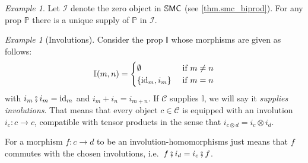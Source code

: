 \documentclass[11pt, oneside, article]{memoir}
\theoremstyle{plain}
\theoremstyle{definition}
\theoremstyle{remark}
\newtheorem{example}[theorem]{Example}
\newcommand{\cat}[1]{\mathcal{#1}}%
\newcommand{\ccat}[1]{\mathbb{#1}}%
\newcommand{\Cat}[1]{{\mathsf{#1}}}%
\newcommand{\CCat}[1]{\mathbb{\StrLeft{#1}{1}}\Cat{\StrGobbleLeft{#1}{1}}}%
\DeclareMathOperator{\id}{id}
\newcommand{\tn}[1]{\textnormal{#1}}
\newcommand{\ssmc}{\CCat{SMC}}
\newcommand{\pp}{\mathbb{P}}
\newcommand{\zero}{\cat{I}}
\newcommand{\cp}{\mathbin{\fatsemi}}
\begin{document}
\begin{example}\label{ex.terminal_supply}
Let $\zero$ denote the zero object in $\ssmc$ (see \cref{thm.smc_biprod}). For any prop $\pp$ there is a unique supply of $\pp$ in $\zero$.
\end{example}

\begin{example}[Involutions]\label{ex.supply_involutions}
Consider the prop $\ccat{I}$ whose morphisms are given as follows:
\[
  \ccat{I}(m,n)=
  \begin{cases}
  	\emptyset&\tn{ if }m\neq n\\
		\{\id_m, i_m\}&\tn{ if }m=n
  \end{cases}
 \]
 with $i_m\cp i_m=\id_m$ and $i_m+i_n=i_{m+n}$. If $\cat{C}$ supplies $\ccat{I}$, we will say it \emph{supplies involutions}. That means that every object $c\in\cat{C}$ is equipped with an involution $i_c\colon c\to c$, compatible with tensor products in the sense that $i_{c\otimes d}=i_c\otimes i_d$.
 
For a morphism $f\colon c\to d$ to be an involution-homomorphisms just means that $f$ commutes with the chosen involutions, i.e.\ $f\cp i_d=i_c\cp f$.
\end{example}
\end{document}
